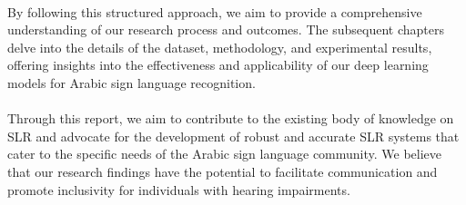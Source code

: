 \paragraph{}
By following this structured approach, we aim to provide a comprehensive understanding of our research process and outcomes. The subsequent chapters delve into the details of the dataset, methodology, and experimental results, offering insights into the effectiveness and applicability of our deep learning models for Arabic sign language recognition.
\paragraph{}
Through this report, we aim to contribute to the existing body of knowledge on SLR and advocate for the development of robust and accurate SLR systems that cater to the specific needs of the Arabic sign language community. We believe that our research findings have the potential to facilitate communication and promote inclusivity for individuals with hearing impairments.
